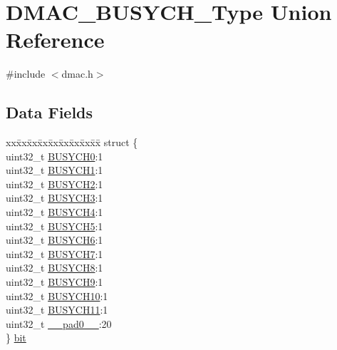 \hypertarget{union_d_m_a_c___b_u_s_y_c_h___type}{}\section{D\+M\+A\+C\+\_\+\+B\+U\+S\+Y\+C\+H\+\_\+\+Type Union Reference}
\label{union_d_m_a_c___b_u_s_y_c_h___type}


{\ttfamily \#include $<$dmac.\+h$>$}

\subsection*{Data Fields}
\begin{DoxyCompactItemize}
\item 
\begin{tabbing}
xx\=xx\=xx\=xx\=xx\=xx\=xx\=xx\=xx\=\kill
struct \{\\
\>uint32\_t \mbox{\hyperlink{union_d_m_a_c___b_u_s_y_c_h___type_aa1571ede5ca1c085199b3cceb9c3b320}{BUSYCH0}}:1\\
\>uint32\_t \mbox{\hyperlink{union_d_m_a_c___b_u_s_y_c_h___type_a81e26c50e03c3b8d581a7dad0dd29bbb}{BUSYCH1}}:1\\
\>uint32\_t \mbox{\hyperlink{union_d_m_a_c___b_u_s_y_c_h___type_a100b33eb3a5ce9eb81fcd85816892c88}{BUSYCH2}}:1\\
\>uint32\_t \mbox{\hyperlink{union_d_m_a_c___b_u_s_y_c_h___type_a500c82f252d527313dccc03b6eb665f7}{BUSYCH3}}:1\\
\>uint32\_t \mbox{\hyperlink{union_d_m_a_c___b_u_s_y_c_h___type_a52003a8f9bc216bee5dd41e0a490dcd4}{BUSYCH4}}:1\\
\>uint32\_t \mbox{\hyperlink{union_d_m_a_c___b_u_s_y_c_h___type_a9858816b133ca39ff521b2a91ab95285}{BUSYCH5}}:1\\
\>uint32\_t \mbox{\hyperlink{union_d_m_a_c___b_u_s_y_c_h___type_a6ad9ac52aaf2349049012e800f55110b}{BUSYCH6}}:1\\
\>uint32\_t \mbox{\hyperlink{union_d_m_a_c___b_u_s_y_c_h___type_a6d82d3bbea836d0f0ee6123b969877e3}{BUSYCH7}}:1\\
\>uint32\_t \mbox{\hyperlink{union_d_m_a_c___b_u_s_y_c_h___type_a5a04e58ad1b8e1140d90b80c9f244544}{BUSYCH8}}:1\\
\>uint32\_t \mbox{\hyperlink{union_d_m_a_c___b_u_s_y_c_h___type_a76702f2df79ef9fa2118b35f4f08662c}{BUSYCH9}}:1\\
\>uint32\_t \mbox{\hyperlink{union_d_m_a_c___b_u_s_y_c_h___type_a0400fff28ce20cc84860ced250667a78}{BUSYCH10}}:1\\
\>uint32\_t \mbox{\hyperlink{union_d_m_a_c___b_u_s_y_c_h___type_af66716b3fea4aeb93d2f2d001d3dfd89}{BUSYCH11}}:1\\
\>uint32\_t \mbox{\hyperlink{union_d_m_a_c___b_u_s_y_c_h___type_a3e57c2ef1c3ffb36722f000cc1156824}{\_\_pad0\_\_}}:20\\
\} \mbox{\hyperlink{union_d_m_a_c___b_u_s_y_c_h___type_a00602e1998342abd46227ecb553b5fce}{bit}}\\


\end{tabbing}
\end{DoxyCompactItemize}

